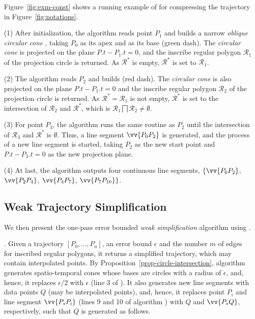 \begin{example}
\label{exm-alg-conest}
Figure~\ref{fig:exm-const} shows a running example of \cist for compressing the trajectory  in Figure~\ref{fig:notations}.

\sstab (1) After initialization, the \cist algorithm reads point $P_1$ and builds a narrow \emph{oblique circular cone} , taking $P_0$ as its apex and  as its base (green dash). The \emph{circular cone} is projected on the plane $P.t-P_1.t=0$, and the inscribe regular polygon $\mathcal{R}_1$ of the projection circle is returned. As $\mathcal{R}^*$ is empty, $\mathcal{R}^*$ is set to $\mathcal{R}_1$.

\sstab(2) The algorithm reads $P_2$ and builds  (red dash). The \emph{circular cone} is also projected on the plane $P.t-P_1.t=0$ and the inscribe regular polygon $\mathcal{R}_2$ of the projection circle is returned. As $\mathcal{R}^*=\mathcal{R}_1$ is not empty, $\mathcal{R}^*$ is set to the intersection of $\mathcal{R}_2$ and $\mathcal{R}^*$, which is $\mathcal{R}_1 \bigsqcap \mathcal{R}_2 \ne \emptyset$.

\sstab (3) For point $P_3$, the algorithm runs the same routine as $P_2$ until the intersection of $\mathcal{R}_3$ and $\mathcal{R}^*$ is $\emptyset$. Thus, a line segment $\vv{P_0P_2}$ is generated, and the process of a new line segment is started, taking $P_2$ as the new start point and $P.t-P_3.t=0$ as the new projection plane.

\sstab (4) At last, the algorithm outputs four continuous line segments, \ie $\{\vv{P_0P_2}$, $\vv{P_2P_4}$, $\vv{P_4P_{7}}$, $\vv{P_7P_{10}}\}$.
\end{example}



\subsection{Weak Trajectory Simplification}

We then present the one-pass error bounded {\em weak simplification} algorithm using \sed.



.
Given a trajectory ${[P_0, \ldots, P_n]}$, an error bound $\epsilon$ and the number $m$ of edges for inscribed
regular polygons, it returns a simplified trajectory,
which may contain interpolated points.
%
By Proposition~\ref{prop-circle-intersection}, algorithm \cista generates spatio-temporal cones whose bases are circles with a radius of $\epsilon$,
and, hence, it replaces $\epsilon/2$ with $\epsilon$ (line 3 of \cist). It also generates new line segments with data points $Q$ (may be interpolated points), and,
hence, it replaces point $P_i$ and line segment $\vv{P_sP_i}$  (lines 9 and 10 of algorithm \cist) with $Q$ and $\vv{P_sQ}$, respectively,  such that $Q$ is generated as follows.


